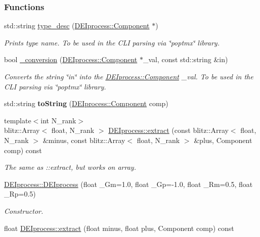 \subsubsection*{Functions}
\begin{DoxyCompactItemize}
\item 
std::string \hyperlink{group__deiedei_ga54d8502bc36bd1a69a96ac2b650231fa}{type\_\-desc} (\hyperlink{classDEIprocess_a3a41867d8f9d10e77541ae8484256cd2}{DEIprocess::Component} $\ast$)
\begin{DoxyCompactList}\small\item\em Prints type name. To be used in the CLI parsing via \char`\"{}poptmx\char`\"{} library. \item\end{DoxyCompactList}\item 
bool \hyperlink{group__deiedei_gac70abafbf5ec5f7b461540b8d93a5ea0}{\_\-conversion} (\hyperlink{classDEIprocess_a3a41867d8f9d10e77541ae8484256cd2}{DEIprocess::Component} $\ast$\_\-val, const std::string \&in)
\begin{DoxyCompactList}\small\item\em Converts the string \char`\"{}in\char`\"{} into the \hyperlink{classDEIprocess_a3a41867d8f9d10e77541ae8484256cd2}{DEIprocess::Component} \_\-val. To be used in the CLI parsing via \char`\"{}poptmx\char`\"{} library. \item\end{DoxyCompactList}\item 
\hypertarget{group__deiedei_ga847d31cc46af5084cdaa29a8d7e51163}{
std::string {\bfseries toString} (\hyperlink{classDEIprocess_a3a41867d8f9d10e77541ae8484256cd2}{DEIprocess::Component} comp)}
\label{group__deiedei_ga847d31cc46af5084cdaa29a8d7e51163}

\item 
{\footnotesize template$<$int N\_\-rank$>$ }\\blitz::Array$<$ float, N\_\-rank $>$ \hyperlink{group__deiedei_ga34485248b43395c10fc232f5f0b9ff2f}{DEIprocess::extract} (const blitz::Array$<$ float, N\_\-rank $>$ \&minus, const blitz::Array$<$ float, N\_\-rank $>$ \&plus, Component comp) const 
\begin{DoxyCompactList}\small\item\em The same as ::extract, but works on array. \item\end{DoxyCompactList}\item 
\hyperlink{group__deiedei_ga200349bd8faedf51792d17acf1bb90e5}{DEIprocess::DEIprocess} (float \_\-Gm=1.0, float \_\-Gp=-\/1.0, float \_\-Rm=0.5, float \_\-Rp=0.5)
\begin{DoxyCompactList}\small\item\em Constructor. \item\end{DoxyCompactList}\item 
float \hyperlink{group__deiedei_ga01cf5896cf83f5c4fd778f78097b2a4d}{DEIprocess::extract} (float minus, float plus, Component comp) const 
\end{DoxyCompactItemize}
